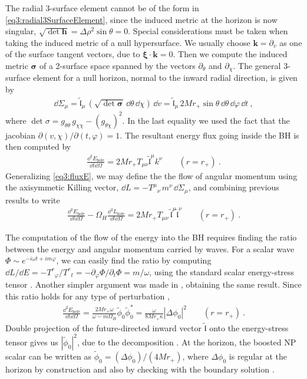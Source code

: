The radial 3-surface element cannot be of the form in \eqref{eq3:radial3SurfaceElement}, since the induced metric at the horizon is now singular, $\sqrt{\det{\bm{h}}}=\Delta \rho^2 \sin\theta = 0$.
Special considerations must be taken when taking the induced metric of a null hypersurface.
We usually choose $\bm{k}=\partial_v$ as one of the surface tangent vectors, due to $\bm{\xi}\cdot\bm{k}=0$.
Then we compute the induced metric $\bm{\sigma}$ of a 2-surface space spanned by the vectors $\partial_\theta$ and $\partial_\chi$.
The general 3-surface element for a null horizon, normal to the inward radial direction, is given by
\begin{align}
    \dd\Sigma_\mu = \tilde{\mathfrak{l}}_\mu \,(\sqrt{\det \bm{\sigma}} \,\dd\theta \,\dd\chi ) \,\dd v = \tilde{\mathfrak{l}}_\mu  \, 2 M r_+ \sin\theta \,\dd\theta \,\dd\varphi \,\dd t ~,
\end{align}
where $\det\sigma = g_{\theta\theta} \,g_{\chi\chi} - (g_{\theta\chi})^2$. In the last equality we used the fact that the jacobian $\partial(v,\chi)/\partial(t,\varphi)=1$.
The resultant energy flux going inside the BH is then computed by
\begin{align}
    \frac{\dd^2 E_\mathrm{hole}}{\dd t \dd\Omega} = 2 M r_{+} T_{\mu\nu} \tilde{\mathfrak{l}}^\mu k^\nu \qquad (r=r_{+})~.
\end{align}
Generalizing \eqref{eq3:fluxE}, we may define the the flow of angular momentum using the axisymmetic Killing vector, $\dd L = - T^{\mu}{}_\nu \, m^\nu \,\dd\Sigma_\mu$, and combining previous results to write
\begin{align}
    \frac{\dd^2 E_\mathrm{hole}}{\dd t \dd\Omega} - \Omega_H \frac{\dd^2 L_\mathrm{hole}}{\dd t \dd\Omega} = 2 M r_{+} T_{\mu\nu} \,\tilde{\mathfrak{l}}^\mu \tilde{\mathfrak{l}}^\nu \qquad (r=r_{+})~.
\end{align}

The computation of the flow of the energy into the BH requires finding the ratio between the energy and angular momentum carried by waves.
For a scalar wave $\Phi\sim e^{-i\omega t+ i m\varphi}$, we can easily find the ratio by computing $\dd L/\dd E = -T^r{}_\varphi/T^r{}_t = - \partial_\varphi \Phi / \partial_t \Phi = m/\omega$, using the standard scalar energy-stress tensor \cite{Bekenstein1973}.
Another simpler argument was made in , obtaining the same result.
Since this ratio holds for any type of perturbation \cite{Teukolsky1974},
\begin{align}
    \frac{\dd^2 E_\mathrm{hole}}{\dd t \dd\Omega} = \frac{2 M r_{+} \omega}{\omega - m \Omega_H}  \tilde{\phi}_0 \tilde{\phi}_0^* = \frac{\omega}{8 M r_{+} \kappa} |\Delta \phi_0 |^2 \qquad (r=r_{+})~.
\end{align}
Double projection of the future-directed inward vector $\bm{\tilde{\mathfrak{l}}}$ onto the energy-stress tensor gives us $|\tilde{\phi}_0|^2$, due to the decomposition .
At the horizon, the boosted NP scalar can be written as $\tilde{\phi}_0 = (\Delta \phi_0)/(4 M r_{+})$, where $\Delta \phi_0$ is regular at the horizon by construction and also by checking with the boundary solution .

